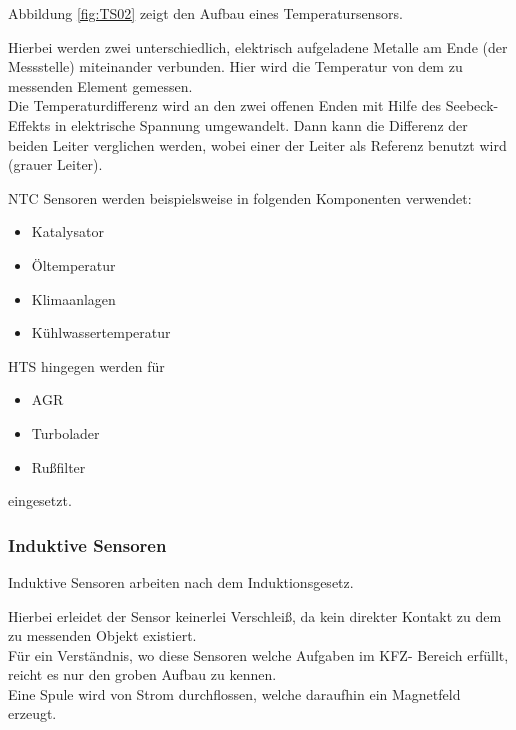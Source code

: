 	            Abbildung \ref{fig:TS02} zeigt den Aufbau eines Temperatursensors.
	
	            Hierbei werden zwei unterschiedlich, elektrisch aufgeladene Metalle am Ende (der Messstelle) miteinander verbunden. Hier wird die Temperatur von dem zu messenden Element gemessen.\\
	            Die Temperaturdifferenz wird an den zwei offenen Enden mit Hilfe des Seebeck-Effekts in elektrische Spannung umgewandelt. 
	            Dann kann die Differenz der beiden Leiter verglichen werden, wobei einer der Leiter als Referenz benutzt wird (grauer Leiter).\cite{TS_temp} 
						
				NTC Sensoren werden beispielsweise in folgenden Komponenten verwendet:
				
				\begin{itemize}
					\item Katalysator
					\item Öltemperatur
					\item Klimaanlagen
					\item Kühlwassertemperatur 	
				\end{itemize}
				
	            HTS hingegen werden für
	            
				\begin{itemize}
					\item AGR
					\item Turbolader
					\item Rußfilter 
	            \end{itemize}
	            
	            eingesetzt.
	
	            \subsubsection{Induktive Sensoren}
			
	            Induktive Sensoren arbeiten nach dem Induktionsgesetz.
	            
				Hierbei erleidet der Sensor keinerlei Verschleiß, da kein direkter Kontakt zu dem zu messenden Objekt existiert.\\
				Für ein Verständnis, wo diese Sensoren welche Aufgaben im KFZ- Bereich erfüllt, reicht es nur den groben Aufbau zu kennen.\\
				Eine Spule wird von Strom durchflossen, welche daraufhin ein Magnetfeld erzeugt.\\	
	
